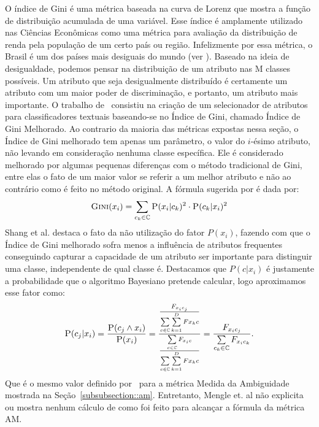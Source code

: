 O índice de Gini é uma métrica baseada na curva de Lorenz que mostra a função de distribuição acumulada de uma variável. Esse índice é amplamente utilizado nas Ciências Econômicas como uma métrica para avaliação da distribuição de renda pela população de um certo país ou região. Infelizmente por essa métrica, o Brasil é um dos países mais desiguais do mundo (ver \cite{cia-gini}). 
Baseado na ideia de desigualdade, podemos pensar na distribuição de um atributo nas M classes possíveis. Um atributo que seja desigualmente distribuído é certamente um atributo com um maior poder de discriminação, e portanto, um atributo mais importante. O trabalho de~\cite{Shang07} consistiu na criação de um selecionador de atributos para classificadores textuais baseando-se no Índice de Gini, chamado Índice de Gini Melhorado. Ao contrario da maioria das métricas expostas nessa seção, o Índice de Gini melhorado tem apenas um parâmetro, o valor do $i$-ésimo atributo, não levando em consideração nenhuma classe específica. Ele é considerado melhorado por algumas pequenas diferenças com o método tradicional de Gini, entre elas o fato de um maior valor se referir a um melhor atributo e não ao contrário como é feito no método original. A fórmula sugerida por \cite{Shang07} é dada por:
\begin{equation}\label{eqn::gini}
 \textsc{Gini}(x_i) = \sum\limits_{c_k \in \mathbb{C}} \textsc{P}(x_i|c_k)^2 \cdot \textsc{P}(c_k|x_i)^2
\end{equation}
Shang et al. destaca o fato da não utilização do fator $P(x_i)$, fazendo com que o Índice de Gini melhorado sofra menos a influência de atributos frequentes conseguindo capturar a capacidade de um atributo ser importante para distinguir uma classe, independente de qual classe é. Destacamos que $P(c|x_i)$ é justamente a probabilidade que o algoritmo Bayesiano pretende calcular, logo aproximamos esse fator como:
\begin{equation}\label{eqn::gini}
 \textsc{P}(c_j|x_i) = \frac{ \textsc{P}(c_j \wedge x_i) } {\textsc{P}(x_i) } = \frac{ \frac{ F_{x_ic_j}}{  \sum\limits_{c \in \mathbb{C}} \sum\limits_{k=1}^{D} {Fx_kc}  } } { \frac{\sum\limits_{c \in \mathbb{C}} F_{x_ic}}{ \sum\limits_{c \in \mathbb{C}} \sum\limits_{k=1}^{D} {Fx_kc}}} = \frac{ F_{x_{i}c_{j}}}{\sum\limits_{c_k \in \mathbb{C}} F_{x_{i}c_{k}}}.
\end{equation}
Que é o mesmo valor definido por~\cite{Mengle08} para a métrica Medida da Ambiguidade mostrada na Seção~\ref{subsubsection::am}. Entretanto, Mengle et. al não explicita ou mostra nenhum cálculo de como foi feito para alcançar a fórmula da métrica \textsc{AM}. 

